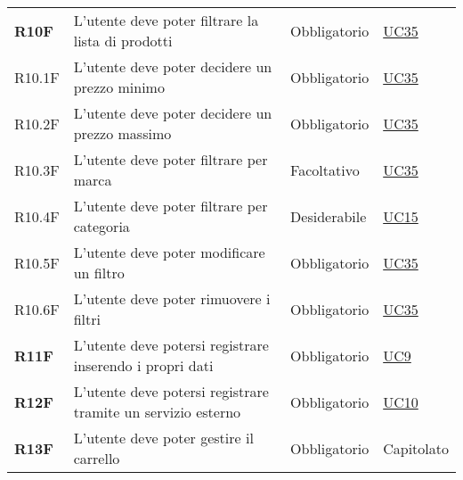 \begin{center}
\begin{longtable}[!h]{p{50px} p{245px} p{75px} p{50px}}
        \textbf{R10F}                         & L'utente deve poter filtrare la lista di prodotti                                                   & Obbligatorio             & \hyperref[sec:UC35]{UC35}                      \\
        R10.1F                                & L'utente deve poter decidere un prezzo minimo                                                       & Obbligatorio             & \hyperref[sec:UC35]{UC35}                      \\
        R10.2F                                & L'utente deve poter decidere un prezzo massimo                                                      & Obbligatorio             & \hyperref[sec:UC35]{UC35}                      \\
        R10.3F                                & L'utente deve poter filtrare per marca                                                              & Facoltativo              & \hyperref[sec:UC35]{UC35}                      \\
        R10.4F                                & L'utente deve poter filtrare per categoria                                                          & Desiderabile             & \hyperref[sec:UC15]{UC15}                      \\
        R10.5F                                & L'utente deve poter modificare un filtro                                                            & Obbligatorio             & \hyperref[sec:UC35]{UC35}                      \\
        R10.6F                                & L'utente deve poter rimuovere i filtri                                                              & Obbligatorio             & \hyperref[sec:UC35]{UC35}                      \\
        \textbf{R11F}                         & L'utente deve potersi registrare inserendo i propri dati                                            & Obbligatorio             & \hyperref[sec:UC9]{UC9}                        \\
        \textbf{R12F}                         & L'utente deve potersi registrare tramite un servizio esterno                                        & Obbligatorio             & \hyperref[sec:UC10]{UC10}                      \\
        \textbf{R13F}                         & L'utente deve poter gestire il carrello                                                             & Obbligatorio             & Capitolato                                     \\

\end{longtable}
\end{center}
